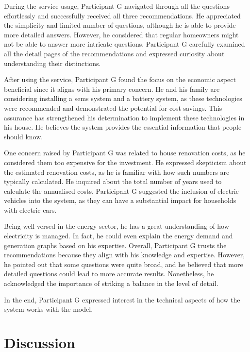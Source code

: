 During the service usage, 
Participant G navigated through all the questions effortlessly and successfully received all three recommendations. 
He appreciated the simplicity and limited number of questions, 
although he is able to provide more detailed answers. 
However, he considered that regular homeowners might not be able to answer more intricate questions. 
Participant G carefully examined all the detail pages of the recommendations and expressed curiosity about understanding their distinctions.

After using the service, 
Participant G found the focus on the economic aspect beneficial since it aligns with his primary concern. 
He and his family are considering installing a \gls{sems} system and a battery system, 
as these technologies were recommended and demonstrated the potential for cost savings. 
This assurance has strengthened his determination to implement these technologies in his house. 
He believes the system provides the essential information that people should know. 

One concern raised by Participant G was related to house renovation costs, 
as he considered them too expensive for the investment. 
He expressed skepticism about the estimated renovation costs, 
as he is familiar with how such numbers are typically calculated. 
He inquired about the total number of years used to calculate the annualised costs.
Participant G suggested the inclusion of electric vehicles into the system, 
as they can have a substantial impact for households with electric cars. 

Being well-versed in the energy sector, he has a great understanding of how electricity is managed. 
In fact, he could even explain the energy demand and generation graphs based on his expertise.
Overall, Participant G trusts the recommendations because they align with his knowledge and expertise. 
However, he pointed out that some questions were quite broad, and he believed that more detailed questions could lead to more accurate results. 
Nonetheless, he acknowledged the importance of striking a balance in the level of detail.

In the end, Participant G expressed interest in the technical aspects of how the system works with the model. 


\section{Discussion}